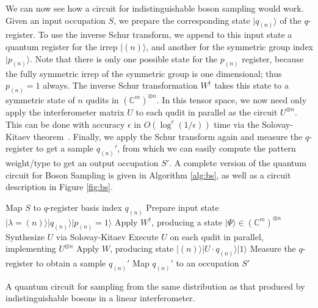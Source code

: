 We can now see how a circuit for indistinguishable boson sampling would work. 
Given an input occupation $S$, we prepare the corresponding state $|q_{(n)}\rangle$ of the $q$-register. 
To use the inverse Schur transform, we append to this input state a quantum register for the irrep $|(n)\rangle$, and another for the symmetric group index $|p_{(n)}\rangle$. 
Note that there is only one possible state for the $p_{(n)}$ register, because the fully symmetric irrep of the symmetric group is one dimensional; thus $p_{(n)}=1$ always.
The inverse Schur transformation $W^\dag$ takes this state to a symmetric state of $n$ qudits in $(\mathbb{C}^m)^{\otimes n}$.
 In this tensor space, we now need only apply the interferometer matrix $U$ to each qudit in parallel as the circuit $U^{\otimes n}$.
This can be done with accuracy $\epsilon$ in $O(\log^c(1/\epsilon))$ time via the Solovay-Kitaev theorem~\cite{nielsen2010, dawson2006}. 
Finally, we apply the Schur transform again and measure the $q$-register to get a sample $q_{(n)}'$, from which we can easily compute the pattern weight/type to get an output occupation $S'$.
A complete version of the quantum circuit for Boson Sampling is given in Algorithm \ref{alg:bs}, as well as a circuit description in Figure \ref{fig:bs}.
\begin{algorithm}
\BlankLine
Map $S$ to $q$-register basis index $q_{(n)}$\;
Prepare input state $|\lambda=(n)\rangle|q_{(n)}\rangle|p_{(n)}=1\rangle$\;
Apply $W^\dagger$, producing a state $|\Psi\rangle \in (\mathbb{C}^m)^{\otimes n}$\;
Synthesize $U$ via Solovay-Kitaev\;
Execute $U$ on each qudit in parallel, implementing $U^{\otimes n}$\;
Apply $W$, producing state $|(n)\rangle|U\cdot q_{(n)}\rangle|1\rangle$\; 
Measure the $q$-register to obtain a sample $q_{(n)}'$\;
Map $q_{(n)}'$ to an occupation $S'$\;
\caption{
A quantum circuit for sampling from the same distribution as that produced by indistinguishable bosons in a linear interferometer.}
\label{alg:bs}
\end{algorithm}


